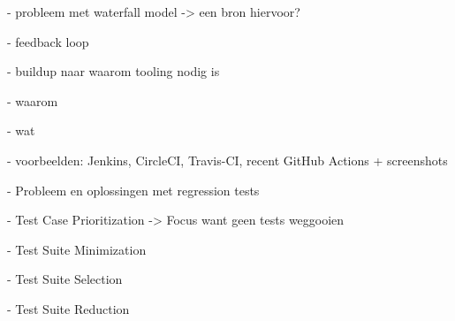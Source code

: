 
- probleem met waterfall model -> een bron hiervoor?

- feedback loop

- buildup naar waarom tooling nodig is

- waarom

- wat

- voorbeelden: Jenkins, CircleCI, Travis-CI, recent GitHub Actions + screenshots

- Probleem en oplossingen met regression tests

  - Test Case Prioritization -> Focus want geen tests weggooien
  
  - Test Suite Minimization
  
  - Test Suite Selection
  
  - Test Suite Reduction
